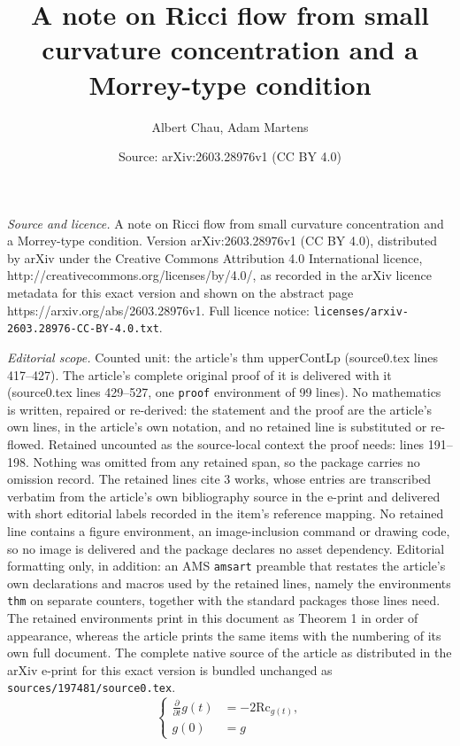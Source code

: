 \documentclass[10pt,a4paper]{amsart}
\title{A note on Ricci flow from small curvature concentration and a Morrey-type condition}
\author{Albert Chau, Adam Martens}
\date{Source: arXiv:2603.28976v1 (CC BY 4.0)}
\begin{document}
\maketitle

\noindent\emph{Source and licence.} A note on Ricci flow from small curvature concentration and a Morrey-type condition. Version arXiv:2603.28976v1 (CC BY 4.0), distributed by arXiv under the Creative Commons Attribution 4.0 International licence, http://creativecommons.org/licenses/by/4.0/, as recorded in the arXiv licence metadata for this exact version and shown on the abstract page https://arxiv.org/abs/2603.28976v1. Full licence notice: \texttt{licenses/arxiv-2603.28976-CC-BY-4.0.txt}.\par\smallskip

\noindent\textit{Editorial scope.} Counted unit: the article's thm upperContLp (source0.tex lines 417--427). The article's complete original proof of it is delivered with it (source0.tex lines 429--527, one \texttt{proof} environment of 99 lines). No mathematics is written, repaired or re-derived: the statement and the proof are the article's own lines, in the article's own notation, and no retained line is substituted or re-flowed.  Retained uncounted as the source-local context the proof needs: lines 191--198.  Nothing was omitted from any retained span, so the package carries no omission record.  The retained lines cite 3 works, whose entries are transcribed verbatim from the article's own bibliography source in the e-print and delivered with short editorial labels recorded in the item's reference mapping.  No retained line contains a figure environment, an image-inclusion command or drawing code, so no image is delivered and the package declares no asset dependency.  Editorial formatting only, in addition: an AMS \texttt{amsart} preamble that restates the article's own declarations and macros used by the retained lines, namely the environments \texttt{thm} on separate counters, together with the standard packages those lines need.  The retained environments print in this document as Theorem 1 in order of appearance, whereas the article prints the same items with the numbering of its own full document.  The complete native source of the article as distributed in the arXiv e-print for this exact version is bundled unchanged as \texttt{sources/197481/source0.tex}.
\begin{equation}\label{RF}
                \left\{
                \begin{aligned}
                        \frac{{\partial }}{{\partial t}}g(t) &= -2 \text{Rc}_{g(t)}, \\
                        g(0) &= g
                \end{aligned}
                \right.
\end{equation}
\end{document}
